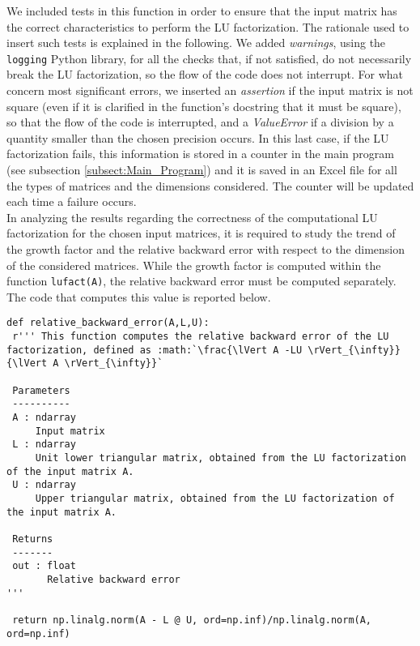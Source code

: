 \documentclass[a4paper,11pt]{report}
\begin{document}
\noindent We included tests in this function in order to ensure that the input matrix has the correct characteristics to perform the LU factorization. The rationale used to insert such tests is explained in the following. We added \textit{warnings}, using the \texttt{logging} Python library, for all the checks that, if not satisfied, do not necessarily break the LU factorization, so the flow of the code does not interrupt.
For what concern most significant errors, we inserted an \textit{assertion} if the input matrix is not square (even if it is clarified in the function's docstring that it must be square), so that the flow of the code is interrupted, and a \textit{ValueError} if a division by a quantity smaller than the chosen precision occurs. In this last case, if the LU factorization fails, this information is stored in a counter in the main program (see subsection \ref{subsect:Main_Program}) and it is saved in an Excel file for all the types of matrices and the dimensions considered. The counter will be updated each time a failure occurs.\\

\noindent In analyzing the results regarding the correctness of the computational LU factorization for the chosen input matrices, it is required to study the trend of the growth factor and the relative backward error with respect to the dimension of the considered matrices. While the growth factor is computed within the function \texttt{lufact(A)}, the relative backward error must be computed separately. The code that computes this value is reported below.

\begin{verbatim}
def relative_backward_error(A,L,U):
 r''' This function computes the relative backward error of the LU factorization, defined as :math:`\frac{\lVert A -LU \rVert_{\infty}}{\lVert A \rVert_{\infty}}`

 Parameters
 ----------
 A : ndarray
     Input matrix
 L : ndarray
     Unit lower triangular matrix, obtained from the LU factorization of the input matrix A.
 U : ndarray
     Upper triangular matrix, obtained from the LU factorization of the input matrix A.

 Returns
 -------
 out : float
       Relative backward error
'''

 return np.linalg.norm(A - L @ U, ord=np.inf)/np.linalg.norm(A, ord=np.inf)
\end{verbatim}
\end{document}

